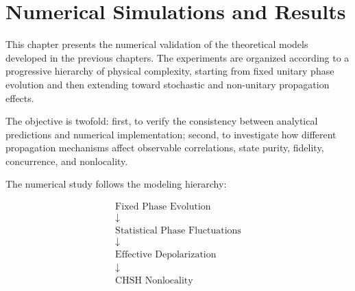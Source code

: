 
\chapter{Numerical Simulations and Results}
\label{ch:numerical_simulations}

This chapter presents the numerical validation of the theoretical models developed in the previous chapters. The experiments are organized according to a progressive hierarchy of physical complexity, starting from fixed unitary phase evolution and then extending toward stochastic and non-unitary propagation effects.

The objective is twofold: first, to verify the consistency between analytical predictions and numerical implementation; second, to investigate how different propagation mechanisms affect observable correlations, state purity, fidelity, concurrence, and nonlocality.

The numerical study follows the modeling hierarchy:

\[
\begin{array}{c}
\text{Fixed Phase Evolution}
\\
\downarrow
\\
\text{Statistical Phase Fluctuations}
\\
\downarrow
\\
\text{Effective Depolarization}
\\
\downarrow
\\
\text{CHSH Nonlocality}
\end{array}
\]







